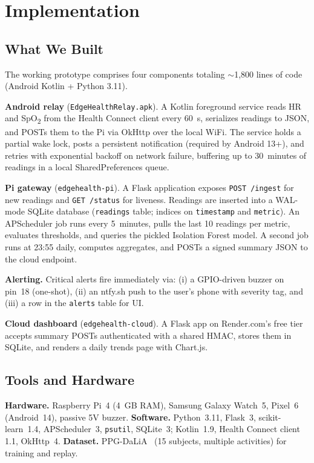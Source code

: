 \documentclass[conference]{IEEEtran}
\begin{document}
\section{Implementation}

\subsection{What We Built}

The working prototype comprises four components totaling $\sim$1{,}800 lines of code (Android Kotlin + Python 3.11).

\textbf{Android relay} (\texttt{EdgeHealthRelay.apk}). A Kotlin foreground service reads HR and SpO\textsubscript{2} from the Health Connect client every 60~s, serializes readings to JSON, and POSTs them to the Pi via OkHttp over the local WiFi. The service holds a partial wake lock, posts a persistent notification (required by Android 13+), and retries with exponential backoff on network failure, buffering up to 30~minutes of readings in a local SharedPreferences queue.

\textbf{Pi gateway} (\texttt{edgehealth-pi}). A Flask application exposes \texttt{POST /ingest} for new readings and \texttt{GET /status} for liveness. Readings are inserted into a WAL-mode SQLite database (\texttt{readings} table; indices on \texttt{timestamp} and \texttt{metric}). An APScheduler job runs every 5~minutes, pulls the last 10 readings per metric, evaluates thresholds, and queries the pickled Isolation Forest model. A second job runs at 23:55 daily, computes aggregates, and POSTs a signed summary JSON to the cloud endpoint.

\textbf{Alerting.} Critical alerts fire immediately via: (i) a GPIO-driven buzzer on pin~18 (one-shot), (ii) an ntfy.sh push to the user's phone with severity tag, and (iii) a row in the \texttt{alerts} table for UI.

\textbf{Cloud dashboard} (\texttt{edgehealth-cloud}). A Flask app on Render.com's free tier accepts summary POSTs authenticated with a shared HMAC, stores them in SQLite, and renders a daily trends page with Chart.js.

\subsection{Tools and Hardware}

\textbf{Hardware.} Raspberry Pi~4 (4~GB RAM), Samsung Galaxy Watch~5, Pixel~6 (Android~14), passive 5V buzzer. \textbf{Software.} Python~3.11, Flask~3, scikit-learn~1.4, APScheduler~3, \texttt{psutil}, SQLite~3; Kotlin~1.9, Health Connect client 1.1, OkHttp~4. \textbf{Dataset.} PPG-DaLiA~\cite{ppg_dalia} (15 subjects, multiple activities) for training and replay.
\end{document}
